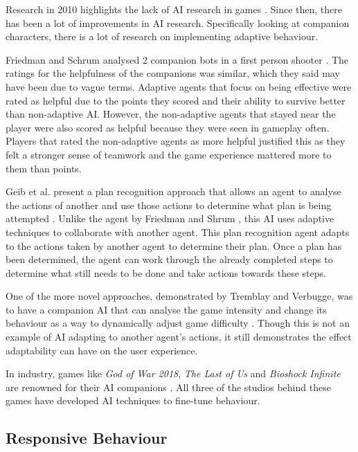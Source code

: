 \documentclass{IEEEtran}
\begin{document}
Research in 2010 highlights the lack of AI research in games \cite{RealTimeAICritique2010}. Since then, there has been a lot of improvements in AI research. Specifically looking at companion characters, there is a lot of research on implementing adaptive behaviour.

Friedman and Schrum analysed 2 companion bots in a first person shooter \cite{CompanionBotsFPS2019}. The ratings for the helpfulness of the companions was similar, which they said may have been due to vague terms. Adaptive agents that focus on being effective were rated as helpful due to the points they scored and their ability to survive better than non-adaptive AI. However, the non-adaptive agents that stayed near the player were also scored as helpful because they were seen in gameplay often. Players that rated the non-adaptive agents as more helpful justified this as they felt a stronger sense of teamwork and the game experience mattered more to them than points.

Geib et al. present a plan recognition approach that allows an agent to analyse the actions of another and use those actions to determine what plan is being attempted \cite{GeneratingCollabBehaviourPlanRecognition2016}. Unlike the agent by Friedman and Shrum \cite{CompanionBotsFPS2019}, this AI uses adaptive techniques to collaborate with another agent. This plan recognition agent adapts to the actions taken by another agent to determine their plan. Once a plan has been determined, the agent can work through the already completed steps to determine what still needs to be done and take actions towards these steps.

One of the more novel approaches, demonstrated by Tremblay and Verbugge, was to have a companion AI that can analyse the game intensity and change its behaviour as a way to dynamically adjust game difficulty \cite{tremblay2013adaptive}. Though this is not an example of AI adapting to another agent's actions, it still demonstrates the effect adaptability can have on the user experience.

In industry, games like \textit{God of War 2018}, \textit{The Last of Us} and \textit{Bioshock Infinite} are renowned for their AI companions \cite{PlayDontShow}. All three of the studios behind these games have developed AI techniques to fine-tune behaviour.

\subsection{Responsive Behaviour}
\label{Responsive Behaviour}
\end{document}
